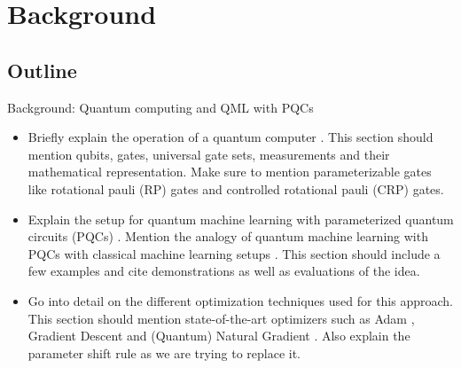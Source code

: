\chapter{Background}
\label{chap:background}

\section{Outline}
Background: Quantum computing and QML with PQCs
\begin{itemize}
    \item
        Briefly explain the operation of a quantum computer
        \cite{nielsen_quantum_2007}.
        This section should mention qubits, gates, universal gate sets,
        measurements and their mathematical representation.
        Make sure to mention parameterizable gates like rotational pauli (RP)
        gates and controlled rotational pauli (CRP) gates.
    \item
        Explain the setup for quantum machine learning with parameterized
        quantum circuits (PQCs) \cite{mitarai_quantum_2018}.
        Mention the analogy of quantum machine learning with PQCs with
        classical machine learning setups \cite{bishop_pattern_2006}.
        This section should include a few examples and cite demonstrations
        as well as evaluations of the idea.
    \item
        Go into detail on the different optimization techniques used for
        this approach.
        This section should mention state-of-the-art optimizers such as
        Adam \cite{kingma_adam_2017}, Gradient Descent and
        (Quantum) Natural Gradient \cite{stokes_quantum_2020}.
        Also explain the parameter shift rule
        \cite{mitarai_quantum_2018,schuld_evaluating_2019} as we are trying
        to replace it.
\end{itemize}
